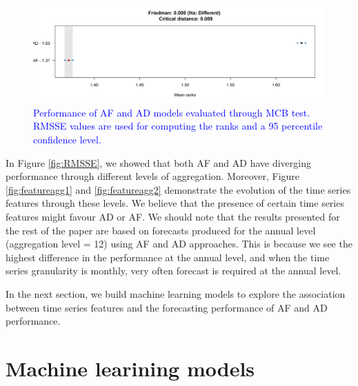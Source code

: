 \documentclass[preprint, 3p,
authoryear]{elsarticle} %
\begin{document}
\begin{figure}[H]

{\centering \includegraphics[width=1\linewidth]{img/Fig_MCB} 

}

\caption{ \textcolor{blue}{Performance of AF and AD models evaluated through MCB test. RMSSE values are used for computing the ranks and a 95 percentile confidence level.}}\label{fig:MCB}
\end{figure}

In Figure \ref{fig:RMSSE}, we showed that both AF and AD have diverging
performance through different levels of aggregation. Moreover, Figure
\ref{fig:featureagg1} and \ref{fig:featureagg2} demonstrate the
evolution of the time series features through these levels. We believe
that the presence of certain time series features might favour AD or AF.
We should note that the results presented for the rest of the paper are
based on forecasts produced for the annual level (aggregation level =
12) using AF and AD approaches. This is because we see the highest
difference in the performance at the annual level, and when the time
series granularity is monthly, very often forecast is required at the
annual level.

In the next section, we build machine learning models to explore the
association between time series features and the forecasting performance
of AF and AD performance.

\hypertarget{ml}{%
\section{Machine learining models}\label{ml}}
\end{document}
